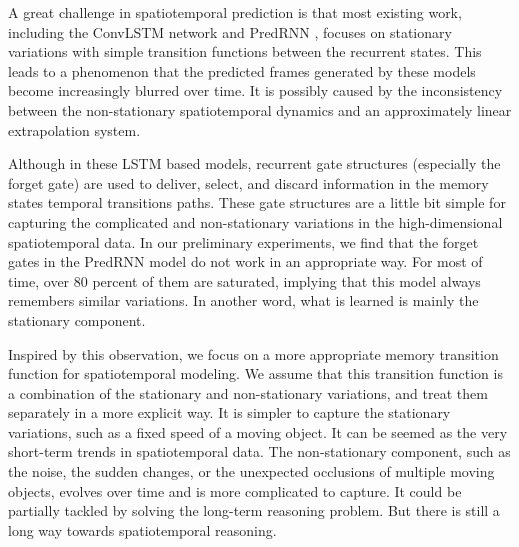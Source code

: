 \documentclass[10pt,twocolumn,letterpaper]{article}
\begin{document}
A great challenge in spatiotemporal prediction is that most existing work, including the ConvLSTM network \citep{shi2015convolutional} and PredRNN \citep{wang2017predrnn}, focuses on stationary variations with simple transition functions between the recurrent states. This leads to a phenomenon that the predicted frames generated by these models become increasingly blurred over time. It is possibly caused by the inconsistency between the non-stationary spatiotemporal dynamics and an approximately linear extrapolation system.

Although in these LSTM \citep{hochreiter1997long} based models, recurrent gate structures (especially the forget gate) are used to deliver, select, and discard information in the memory states temporal transitions paths. These gate structures are a little bit simple for capturing the complicated and non-stationary variations in the high-dimensional spatiotemporal data. In our preliminary experiments, we find that the forget gates in the PredRNN model \citep{wang2017predrnn} do not work in an appropriate way. For most of time, over 80 percent of them are saturated, implying that this model always remembers similar variations. In another word, what is learned is mainly the stationary component. 

Inspired by this observation, we focus on a more appropriate memory transition function for spatiotemporal modeling. We assume that this transition function is a combination of the stationary and non-stationary variations, and treat them separately in a more explicit way. It is simpler to capture the stationary variations, such as a fixed speed of a moving object. It can be seemed as the very short-term trends in spatiotemporal data. The non-stationary component, such as the noise, the sudden changes, or the unexpected occlusions of multiple moving objects, evolves over time and is more complicated to capture. It could be partially tackled by solving the long-term reasoning problem. But there is still a long way towards spatiotemporal reasoning. 
\end{document}
